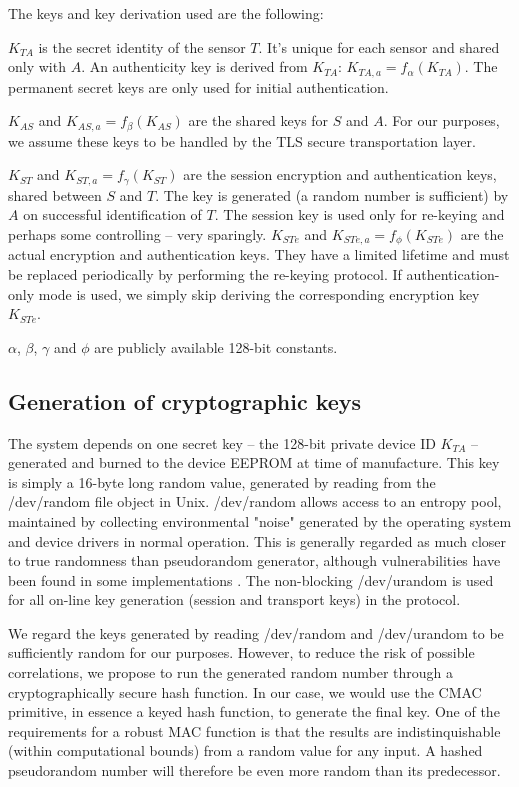 The keys and key derivation used are the following:
%
\begin{description}
\item $K_{TA}$ is the secret identity of the sensor $T$. It's unique for each sensor and shared only with $A$. An authenticity key is derived from $K_{TA}$: $K_{TA,a} = f_\alpha(K_{TA})$. The permanent secret keys are only used for initial authentication.
\item $K_{AS}$ and $K_{AS,a}=f_\beta(K_{AS})$ are the shared keys for $S$ and $A$. For our purposes, we assume these keys to be handled by the TLS secure transportation layer.
\item $K_{ST}$ and $K_{ST,a}=f_\gamma(K_{ST})$ are the session encryption and authentication keys, shared between $S$ and $T$. The key is generated (a random number is sufficient) by $A$ on successful identification of $T$. The session key is used only for re-keying and perhaps some controlling -- very sparingly.
$K_{STe}$ and $K_{STe,a}=f_\phi(K_{STe})$ are the actual encryption and authentication keys. They have a limited lifetime and must be replaced periodically by performing the re-keying protocol. If authentication-only mode is used, we simply skip deriving the corresponding encryption key $K_{STe}$.
\end{description}
$\alpha$, $\beta$, $\gamma$ and $\phi$ are publicly available 128-bit constants.

\subsection{Generation of cryptographic keys}

The system depends on one secret key -- the 128-bit private device ID $K_{TA}$ -- generated and burned to the device EEPROM at time of manufacture. This key is simply a 16-byte long random value, generated by reading from the /dev/random file object in Unix. /dev/random allows access to an entropy pool, maintained by collecting environmental "noise" generated by the operating system and device drivers in normal operation. This is generally regarded as much closer to true randomness than pseudorandom generator, although vulnerabilities have been found in some implementations . The non-blocking /dev/urandom is used for all on-line key generation (session and transport keys) in the protocol.

We regard the keys generated by reading /dev/random and /dev/urandom to be sufficiently random for our purposes. However, to reduce the risk of possible correlations, we propose to run the generated random number through a cryptographically secure hash function. In our case, we would use the CMAC primitive, in essence a keyed hash function, to generate the final key. One of the requirements for a robust MAC function is that the results are indistinquishable (within computational bounds) from a random value for any input. A hashed pseudorandom number will therefore be even more random than its predecessor. 

